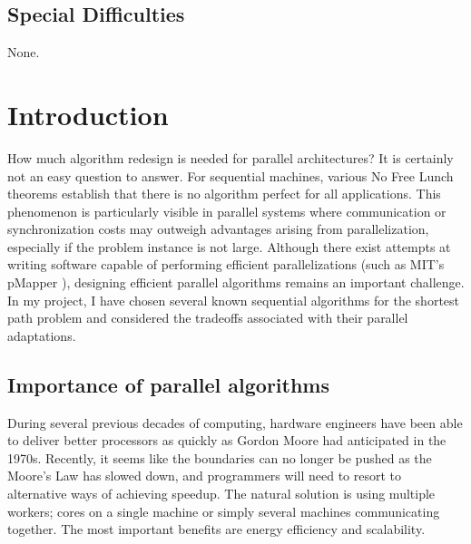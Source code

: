 \documentclass[12pt,a4paper,oneside,openright]{report}
\begin{document}
\section*{Special Difficulties}
None.




\tableofcontents
\pagestyle{headings}
\chapter{Introduction}
How much algorithm redesign is needed for parallel architectures? It is certainly not an easy question to answer. For sequential machines, various No Free Lunch theorems \cite{free-lunch} establish that there is no algorithm perfect for all applications. This phenomenon is particularly visible in parallel systems where communication or synchronization costs may outweigh advantages arising from parallelization, especially if the problem instance is not large. Although there exist attempts at writing software capable of performing efficient parallelizations (such as MIT's pMapper \cite{pmapper}), designing efficient parallel algorithms remains an important challenge. In my project, I have chosen several known sequential algorithms for the shortest path problem and considered the tradeoffs associated with their parallel adaptations.
\section{Importance of parallel algorithms}
During several previous decades of computing, hardware engineers have been able to deliver better processors as quickly as Gordon Moore had anticipated in the 1970s. Recently, it seems like the boundaries can no longer be pushed as the Moore's Law has slowed down\cite{moore-law}, and programmers will need to resort to alternative ways of achieving speedup. The natural solution is using multiple workers; cores on a single machine or simply several machines communicating together. The most important benefits are energy efficiency and scalability. 
\end{document}
